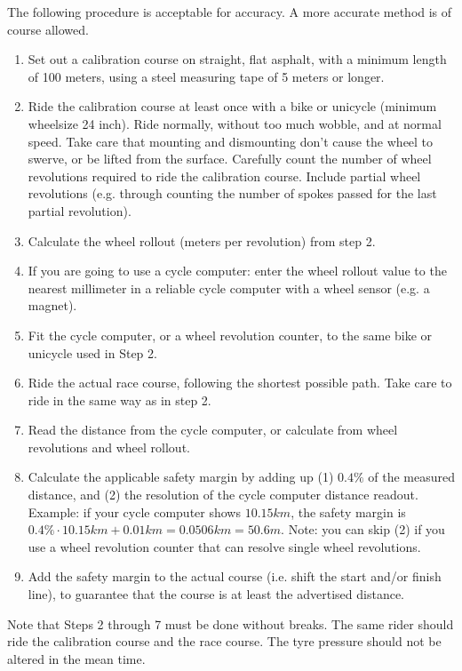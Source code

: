 The following procedure is acceptable for accuracy. A more accurate method is of course allowed.
\begin{enumerate}
\item Set out a calibration course on straight, flat asphalt, with a minimum length of 100 meters, using a steel measuring tape of 5 meters or longer. 
\item Ride the calibration course at least once with a bike or unicycle (minimum wheelsize 24 inch). Ride normally, without too much wobble, and at normal speed. Take care that mounting and dismounting don't cause the wheel to swerve, or be lifted from the surface. Carefully count the number of wheel revolutions required to ride the calibration course. Include partial wheel revolutions (e.g. through counting the number of spokes passed for the last partial revolution). 
\item Calculate the wheel rollout (meters per revolution) from step 2. 
\item If you are going to use a cycle computer: enter the wheel rollout value to the nearest millimeter in a reliable cycle computer with a wheel sensor (e.g. a magnet). 
\item Fit the cycle computer, or a wheel revolution counter, to the same bike or unicycle used in Step 2. 
\item Ride the actual race course, following the shortest possible path. Take care to ride in the same way as in step 2. 
\item Read the distance from the cycle computer, or calculate from wheel revolutions and wheel rollout. 
\item Calculate the applicable safety margin by adding up (1) $0.4\%$ of the measured distance, and (2) the resolution of the cycle computer distance readout. 
Example: if your cycle computer shows $10.15\unit{km}$, the safety margin is $0.4\% \cdot 10.15\unit{km} + 0.01\unit{km} = 0.0506\unit{km} = 50.6\unit{m}$. 
Note: you can skip (2) if you use a wheel revolution counter that can resolve single wheel revolutions. 
\item Add the safety margin to the actual course (i.e. shift the start and/or finish line), to guarantee that the course is at least the advertised distance.
\end{enumerate}
Note that Steps 2 through 7 must be done without breaks. The same rider should ride the calibration course and the race course. The tyre pressure should not be altered in the mean time.

